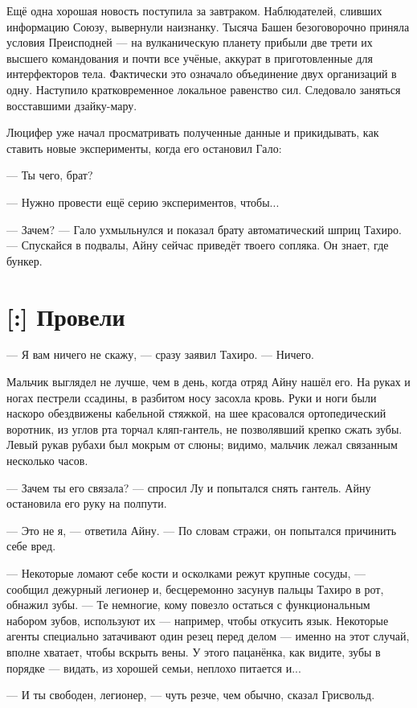 Ещё одна хорошая новость поступила за завтраком.
Наблюдателей, сливших информацию Союзу, вывернули наизнанку.
Тысяча Башен безоговорочно приняла условия Преисподней --- на вулканическую планету прибыли две трети их высшего командования и почти все учёные, аккурат в приготовленные для интерфекторов тела.
Фактически это означало объединение двух организаций в одну.
Наступило кратковременное локальное равенство сил.
Следовало заняться восставшими дзайку-мару.

Люцифер уже начал просматривать полученные данные и прикидывать, как ставить новые эксперименты, когда его остановил Гало:

--- Ты чего, брат?

--- Нужно провести ещё серию экспериментов, чтобы...

--- Зачем? --- Гало ухмыльнулся и показал брату автоматический шприц Тахиро.
--- Спускайся в подвалы, Айну сейчас приведёт твоего сопляка.
Он знает, где бункер.

\section{[:] Провели}

--- Я вам ничего не скажу, --- сразу заявил Тахиро.
--- Ничего.

Мальчик выглядел не лучше, чем в день, когда отряд Айну нашёл его.
На руках и ногах пестрели ссадины, в разбитом носу засохла кровь.
Руки и ноги были наскоро обездвижены кабельной стяжкой, на шее красовался ортопедический воротник, из углов рта торчал кляп-гантель, не позволявший крепко сжать зубы.
Левый рукав рубахи был мокрым от слюны;
видимо, мальчик лежал связанным несколько часов.

--- Зачем ты его связала? --- спросил Лу и попытался снять гантель.
Айну остановила его руку на полпути.

--- Это не я, --- ответила Айну.
--- По словам стражи, он попытался причинить себе вред.

--- Некоторые ломают себе кости и осколками режут крупные сосуды, --- сообщил дежурный легионер и, бесцеремонно засунув пальцы Тахиро в рот, обнажил зубы.
--- Те немногие, кому повезло остаться с функциональным набором зубов, используют их --- например, чтобы откусить язык.
Некоторые агенты специально затачивают один резец перед делом --- именно на этот случай, вполне хватает, чтобы вскрыть вены.
У этого пацанёнка, как видите, зубы в порядке --- видать, из хорошей семьи, неплохо питается и...

--- И ты свободен, легионер, --- чуть резче, чем обычно, сказал Грисвольд.

